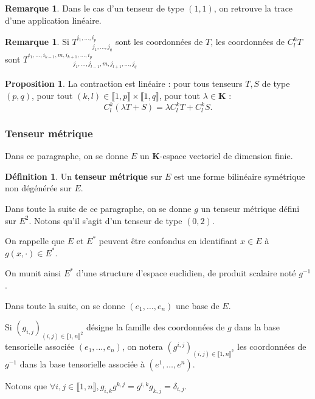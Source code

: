 \documentclass[12pt,a4paper]{article}
\theoremstyle{definition}
\newtheorem{prop}[thm]{Proposition}
\newtheorem{defn}[thm]{Définition}
\newtheorem{rqe}[thm]{Remarque}
\begin{document}
\begin{rqe}
Dans le cas d'un tenseur de type $(1,1)$, on retrouve la trace d'une application linéaire.
\end{rqe}
\begin{rqe}
Si $T_{\;\;\qquad j_1,\ldots,j_q}^{i_1,\ldots,i_p}$ sont les coordonnées de $T$, les coordonnées de $C^k_lT$ sont $T_{\;\;\quad\qquad\qquad\qquad j_1,\ldots,j_{l-1},m,j_{l+1},\ldots,j_q}^{i_1,\ldots,i_{k-1},m,i_{k+1},\ldots,i_p}$
\end{rqe}
\begin{prop}
La contraction est linéaire : pour tous tenseurs $T,S$ de type $(p,q)$, pour tout $(k,l)\in\llbracket 1,p\rrbracket\times\llbracket 1,q\rrbracket$, pour tout $\lambda\in\mathbf{K}$ :
$$
C^k_l(\lambda T+S)=\lambda C^k_lT+C^k_lS.
$$
\end{prop}
\newpage
\subsubsection{Tenseur métrique}
Dans ce paragraphe, on se donne $E$ un $\mathbf{K}$-espace vectoriel de dimension finie.
\begin{defn}
Un \textbf{tenseur métrique} sur $E$ est une forme bilinéaire symétrique non dégénérée sur $E$.
\end{defn}
Dans toute la suite de ce paragraphe, on se donne $g$ un tenseur métrique défini sur $E^2$. Notons qu'il s'agit d'un tenseur de type $(0,2)$.

On rappelle que $E$ et $E^*$ peuvent être confondus en identifiant $x\in E$ à $g(x,\cdot)\in E^*$.

On munit ainsi $E^*$ d'une structure d'espace euclidien, de produit scalaire noté $g^{-1}$.

\medskip

Dans toute la suite, on se donne $(e_1,\ldots,e_n)$ une base de $E$.

\medskip

Si $\left(g_{i,j}\right)_{(i,j)\in\llbracket 1,n\rrbracket^2}$ désigne la famille des coordonnées de $g$ dans la base tensorielle associée $(e_1,\ldots,e_n)$, on notera $\left(g^{i,j}\right)_{(i,j)\in\llbracket 1,n\rrbracket^2}$ les coordonnées de $g^{-1}$ dans la base tensorielle associée à $\left(e^1,\ldots,e^n\right)$.

Notons que $\forall i,j\in\llbracket 1,n\rrbracket, g_{i,k}g^{k,j}=g^{i,k}g_{k,j}=\delta_{i,j}$.
\end{document}
